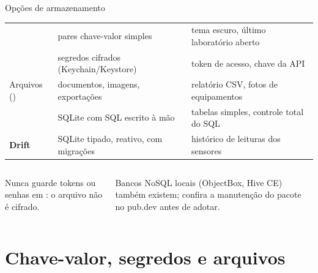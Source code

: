 \documentclass[aspectratio=169,10pt]{beamer}
\begin{document}
\begin{frame}{Opções de armazenamento}
  \footnotesize
  \begin{tabularx}{\textwidth}{@{}p{3.6cm} L L@{}}
    \toprule
     &  &  \\
    \midrule
     & pares chave-valor simples & tema escuro, último laboratório aberto \\
     & segredos cifrados (Keychain/Keystore) & token de acesso, chave da API \\
    Arquivos () & documentos, imagens, exportações & relatório CSV, fotos de equipamentos \\
     & SQLite com SQL escrito à mão & tabelas simples, controle total do SQL \\
    \textbf{Drift} & SQLite tipado, reativo, com migrações & histórico de leituras dos sensores \\
    \bottomrule
  \end{tabularx}
  \vspace{4pt}
  \begin{columns}[T]
    \begin{column}{0.47\textwidth}
      \begin{atencao}
        Nunca guarde tokens ou senhas em : o arquivo não é cifrado.
      \end{atencao}
    \end{column}
    \begin{column}{0.47\textwidth}
      \begin{dica}
        Bancos NoSQL locais (ObjectBox, Hive CE) também existem; confira a manutenção do pacote no pub.dev antes de adotar.
      \end{dica}
    \end{column}
  \end{columns}
\end{frame}

\section{Chave-valor, segredos e arquivos}
\end{document}
